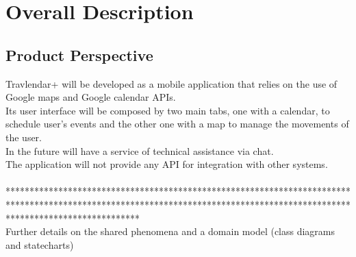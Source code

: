 %
%
\chapter{Overall Description}
%
\label{cap:overalldescription}
%
%
\section{Product Perspective}
Travlendar+ will be developed as a mobile application that relies on the use of Google maps and Google calendar APIs. \\
Its user interface will be composed by two main tabs, one with a calendar, to schedule user's events and the other one with a map to manage the movements of the user. \\
In the future will have a service of technical assistance via chat. \\
The application will not provide any API for integration with other systems.
\\
\\
**************************************************************************************************************************************************************************** \\
Further details on the shared phenomena and a domain model (class diagrams and statecharts)
\\
\\
